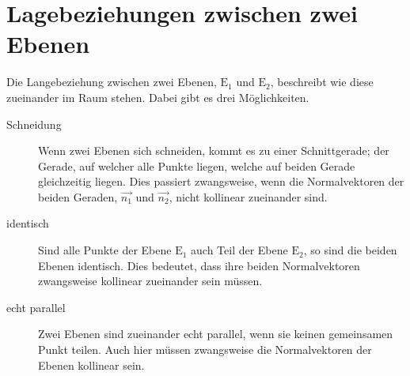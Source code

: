\documentclass{article}
\begin{document}
 
\newcommand{\vect}[1]{\overrightarrow{#1}}
  
\section{Lagebeziehungen zwischen zwei Ebenen}
Die Langebeziehung zwischen zwei Ebenen, $\mathrm{E}_1$ und $\mathrm{E}_2$, beschreibt wie diese zueinander im Raum stehen. Dabei gibt es drei Möglichkeiten.
\begin{description}
 \item[Schneidung] Wenn zwei Ebenen sich schneiden, kommt es zu einer Schnittgerade; der Gerade, auf welcher alle Punkte liegen, welche auf beiden Gerade gleichzeitig liegen. Dies passiert zwangsweise, wenn die Normalvektoren der beiden Geraden, $\vect{n_1}$ und $\vect{n_2}$, nicht kollinear zueinander sind.
 \item[identisch] Sind alle Punkte der Ebene $\mathrm{E}_1$ auch Teil der Ebene $\mathrm{E}_2$, so sind die beiden Ebenen identisch. Dies bedeutet, dass ihre beiden Normalvektoren zwangsweise kollinear zueinander sein müssen.
 \item[echt parallel] Zwei Ebenen sind zueinander echt parallel, wenn sie keinen gemeinsamen Punkt teilen. Auch hier müssen zwangsweise die Normalvektoren der Ebenen kollinear sein.
\end{description}
 
\end{document}
